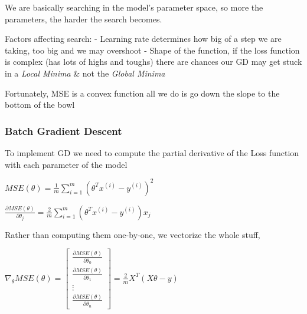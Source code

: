 \documentclass[
]{report}
\begin{document}
We are basically searching in the model's parameter space, so more the
parameters, the harder the search becomes.

Factors affecting search: - Learning rate determines how big of a step
we are taking, too big and we may overshoot - Shape of the function, if
the loss function is complex (has lots of highs and toughs) there are
chances our GD may get stuck in a \emph{Local Minima} \& not the
\emph{Global Minima}

Fortunately, MSE is a convex function all we do is go down the slope to
the bottom of the bowl

\hypertarget{batch-gradient-descent}{%
\subsubsection{Batch Gradient Descent}\label{batch-gradient-descent}}

To implement GD we need to compute the partial derivative of the Loss
function with each parameter of the model

\(MSE(\theta) = \frac{1}{m} \sum_{i=1}^m (\theta^T x^{(i)} - y^{(i)})^2\)

\(\frac{\partial MSE(\theta)}{\partial \theta_{j}} = \frac{2}{m} \sum_{i=1}^m (\theta^T x^{(i)} - y^{(i)}) x_{j}\)

Rather than computing them one-by-one, we vectorize the whole stuff,

\(\nabla_{\theta}MSE(\theta) = \begin{bmatrix} \frac{\partial MSE(\theta)}{\partial \theta_{0}} \\ \frac{\partial MSE(\theta)}{\partial \theta_{1}} \\ \vdots \\ \frac{\partial MSE(\theta)}{\partial \theta_{n}} \end{bmatrix} = \frac{2}{m} X^{T} (X\theta - y)\)
\end{document}
